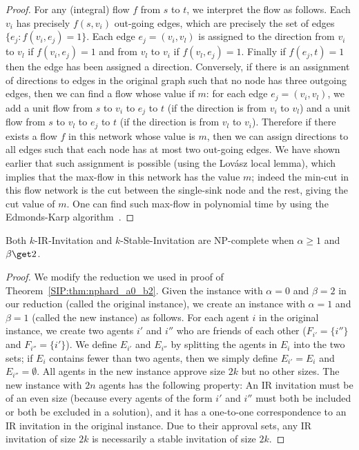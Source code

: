 \begin{proof}
	For any (integral) flow $f$ from $s$ to $t$, we interpret the flow as follows. Each $v_i$ has precisely $f(s, v_i)$ out-going edges, which are precisely the set of edges $\{e_j : f(v_i, e_j) = 1\}$. Each edge $e_j = (v_i, v_l)$ is assigned to the direction from $v_i$ to $v_l$ if $f(v_i, e_j) = 1$ and from $v_l$ to $v_i$ if $f(v_l, e_j) = 1$. Finally if $f(e_j, t) = 1$ then the edge has been assigned a direction. Conversely, if there is an assignment of directions to edges in the original graph such that no node has three outgoing edges, then we can find a flow whose value if $m$: for each edge $e_j = (v_i, v_l)$, we add a unit flow from $s$ to $v_i$ to $e_j$ to $t$ (if the direction is from $v_i$ to $v_l$) and a unit flow from $s$ to $v_l$ to $e_j$ to $t$ (if the direction is from $v_l$ to $v_i$). Therefore if there exists a flow $f$ in this network whose value is $m$, then we can assign directions to all edges such that each node has at most two out-going edges.  We have shown earlier that such assignment is possible (using the Lov{\'a}sz local lemma), which implies that the max-flow in this network has the value $m$; indeed the min-cut in this flow network is the cut between the single-sink node and the rest, giving the cut value of $m$.  One can find such max-flow in polynomial time by using the Edmonds-Karp algorithm~\cite{EdmondsKarp}.
\end{proof}

\begin{theorem} \label{SIP:thm:nphard_a1_b1}
	Both $k$-IR-Invitation and $k$-Stable-Invitation are NP-complete when $\alpha \geq 1$ and $\beta \get 2$. 
\end{theorem} 
\begin{proof}
	We modify the reduction we used in proof of Theorem~\ref{SIP:thm:nphard_a0_b2}. 
	Given the instance with $\alpha = 0$ and $\beta = 2$ in our reduction (called the original instance), we create an instance with $\alpha = 1$ and $\beta = 1$ (called the new instance) as follows.
	For each agent $i$ in the original instance, we create two agents $i'$ and $i''$ who are friends of each other ($F_{i'} = \{i''\}$ and $F_{i''} = \{i'\}$). We define $E_{i'}$ and $E_{i''}$ by splitting the agents in $E_i$ into the two sets; if $E_i$ contains fewer than two agents, then we simply define $E_{i'} = E_i$ and $E_{i''} = \emptyset$. All agents in the new instance approve size $2k$ but no other sizes. The new instance with $2n$ agents has the following property: An IR invitation must be of an even size (because every agents of the form $i'$ and $i''$ must both be included or both be excluded in a solution), and it has a one-to-one correspondence to an IR invitation in the original instance. Due to their approval sets, any IR invitation of size $2k$ is necessarily a stable invitation of size $2k$. 
\end{proof}

